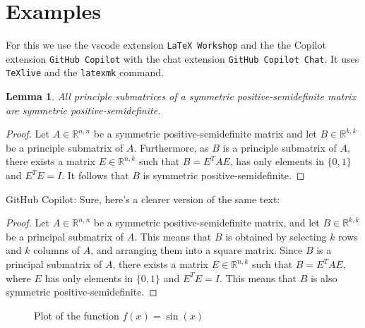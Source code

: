 \documentclass[12pt]{article}
\newcommand{\R}{\mathbb{R}}
\newtheorem{lemma}{Lemma}
\begin{document}
\section{Examples}

For this we use the vscode extension \texttt{LaTeX Workshop} 
and the the Copilot extension \texttt{GitHub Copilot} with 
the chat extension \texttt{GitHub Copilot Chat}.
It uses \texttt{TeXlive} and the \texttt{latexmk} command.


\begin{lemma}
    All principle submatrices of a 
    symmetric positive-semidefinite matrix are
    symmetric positive-semidefinite.
\end{lemma}

\begin{proof}
    Let $A\in \R^{n,n}$ be a symmetric positive-semidefinite matrix and 
    let $B\in\R^{k,k}$ be a principle submatrix of $A$. 
    Furthermore, as $B$ is a principle submatrix of $A$, there exists
    a matrix $E\in\R^{n,k}$ such that $B = E^T A E$, 
    has only elements in $\{0,1\}$ and $E^T E=I$.
    It follows that $B$ is symmetric positive-semidefinite.
\end{proof}

GitHub Copilot: Sure, here's a clearer version of the same text:

\begin{proof}
Let $A\in \R^{n,n}$ be a symmetric positive-semidefinite matrix, 
and let $B\in\R^{k,k}$ be a principal submatrix of $A$. This 
means that $B$ is obtained by selecting $k$ rows and $k$ columns 
of $A$, and arranging them into a square matrix. Since $B$ is 
a principal submatrix of $A$, there exists a matrix 
$E\in\R^{n,k}$ such that $B = E^T A E$, where $E$ has only 
elements in $\{0,1\}$ and $E^T E=I$. This means that $B$ is 
also symmetric positive-semidefinite.
\end{proof}



\begin{figure}
    \centering
    \caption{Plot of the function $f(x) = \sin(x)$}
    \label{fig:sin} 
\end{figure}
\end{document}
